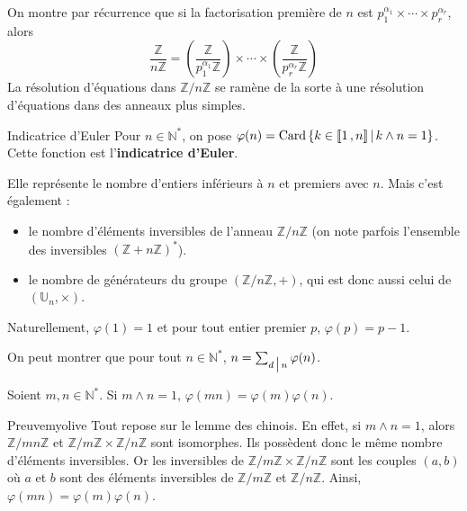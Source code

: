     On montre par récurrence que si la factorisation première de $n$ est $p_1^{\alpha_1} \times \cdots \times p_r^{\alpha_r}$, alors 
    \[ \frac{\mathbb{Z}}{n \mathbb{Z}} = \left(\frac{\mathbb{Z}}{p_1^{\alpha_1} \mathbb{Z}}\right) \times \cdots \times \left(\frac{\mathbb{Z}}{p_r^{\alpha_r} \mathbb{Z}}\right) \]   
    La résolution d’équations dans $\mathbb{Z} / n \mathbb{Z}$ se ramène de la sorte à une résolution d’équations dans des anneaux plus simples.

    \begin{defi}{Indicatrice d’Euler}{}
        Pour $n \in \mathbb{N}^*$, on pose $\varphi(n) = \operatorname{Card}\left\{k \in \left\llbracket 1 \, , n \right\rrbracket \, \middle| \, k \wedge n =1\right\}$. Cette fonction est l’\textbf{indicatrice d’Euler}.
    \end{defi}
    
    Elle représente le nombre d’entiers inférieurs à $n$ et premiers avec $n$. Mais c’est également :
    \begin{itemize}
        \item le nombre d’éléments inversibles de l’anneau $\mathbb{Z} / n \mathbb{Z}$ (on note parfois l’ensemble des inversibles $(\mathbb{Z} + n \mathbb{Z})^*$).
        \item le nombre de générateurs du groupe $(\mathbb{Z} / n \mathbb{Z},+)$, qui est donc aussi celui de $(\mathbb{U}_n,\times)$.
    \end{itemize}
    Naturellement, $\varphi(1) = 1$ et pour tout entier premier $p$, $\varphi(p) = p-1$. 
    
    On peut montrer que pour tout $n \in \mathbb{N}^*$, $n = \sum_{d \, \big| \, n} \varphi(n)$.

    \begin{prop}{}{}
        Soient $m, n \in \mathbb{N}^*$. Si $m \wedge n = 1$, $\varphi(mn) = \varphi(m) \varphi(n)$.
    \end{prop}

    \begin{demo}{Preuve}{myolive}
        Tout repose sur le lemme des chinois. En effet, si $m \wedge n = 1$, alors $\mathbb{Z} / m n \mathbb{Z}$ et $\mathbb{Z} / m \mathbb{Z} \times \mathbb{Z} / n \mathbb{Z}$ sont isomorphes. Ils possèdent donc le même nombre d’éléments inversibles. Or les inversibles de $\mathbb{Z} / m \mathbb{Z} \times \mathbb{Z} / n \mathbb{Z}$ sont les couples $(a,b)$ où $a$ et $b$ sont des éléments inversibles de $\mathbb{Z} / m \mathbb{Z}$ et $\mathbb{Z} / n \mathbb{Z}$. Ainsi, $\varphi(mn) = \varphi(m) \varphi(n)$.
    \end{demo}

